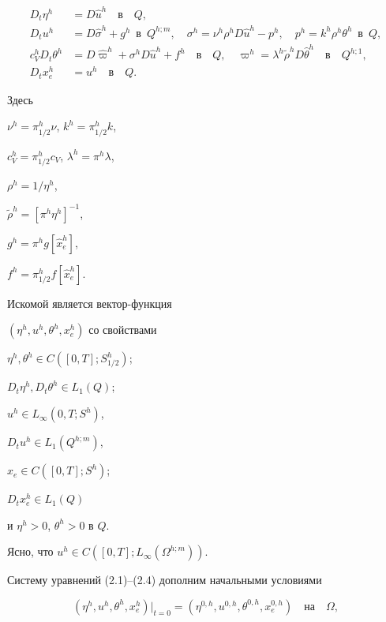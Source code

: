 \begin{align}


D_t\eta^h &= D\widehat u^h\quad\text{в}\quad Q,\\


D_t u^h &= D\widehat\sigma^h + g^h\ \; \text{в}\ \; Q^{h;m},\quad


\sigma^h = \nu^h\rho^h D\widehat u^h - p^h,\quad


p^h=k^h\rho^h\theta^h\ \; \text{в}\ \; Q,\\


c_V^h D_t\theta^h &= D\widehat\varpi^h +


\sigma^h D\widehat u^h + f^h\quad\text{в}\quad Q,\quad


\varpi^h = \lambda^h \widetilde\rho^h D\widehat\theta^h


\quad\text{в}\quad Q^{h;1},\\


D_tx^h_e &= u^h\quad\text{в}\quad Q.


\end{align}


Здесь


$\nu^h=\pi^h_{1/2}\nu$, $k^h = \pi^h_{1/2}k$,


$c_V^h=\pi^h_{1/2}c_V$, $\lambda^h = \pi^h\lambda$,


$\rho^h=1/\eta^h$,


$\widetilde\rho^h=[\pi^h\eta^h]^{-1}$,


$g^h=\pi^h g[\widehat x_e^h]$,


$f^h = \pi^h_{1/2}f[\widehat x^h_e]$.


Искомой является вектор-функция


$(\eta^h, u^h, \theta^h, x_e^h)$ со свойствами


$\eta^h,\theta^h\in C([0,T];S^h_{1/2})$;


$D_t\eta^h,D_t\theta^h\in L_1(Q)$;


$u^h\in L_{\infty}(0,T;S^h)$,


$D_tu^h\in L_1(Q^{h;m})$,


$x_e\in C([0,T];S^h)$;


$D_tx_e^h\in L_1(Q)$


и $\eta^h>0$, $\theta^h>0$ в $Q$.


Ясно, что $u^h\in C([0,T];L_\infty(\Omega^{h;m}))$.


Систему уравнений (2.1)--(2.4) дополним начальными условиями


\begin{equation}


(\eta^h, u^h, \theta^h,x_{e}^h)|_{t=0}=


(\eta^{0,h}, u^{0,h}, \theta^{0,h}, x^{0,h}_{e})\quad \text{на}\quad\Omega,


\end{equation}


